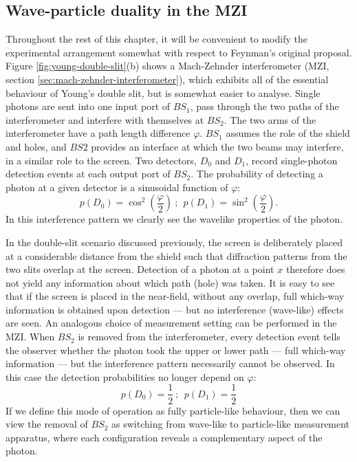
\subsection{Wave-particle duality in the MZI}
Throughout the rest of this chapter, it will be convenient to modify the experimental arrangement somewhat with respect to Feynman's original proposal. Figure \ref{fig:young-double-slit}(b) shows a Mach-Zehnder interferometer (MZI, section \ref{sec:mach-zehnder-interferometer}), which exhibits all of the essential behaviour of Young's double slit, but is somewhat easier to analyse. Single photons are sent into one input port of $BS_1$, pass through the two paths of the interferometer and interfere with themselves at $BS_2$. 
The two arms of the interferometer have a path length difference $\varphi$.
$BS_1$ assumes the role of the shield and holes, and $BS2$ provides an interface at which the two beams may interfere, in a similar role to the screen. Two detectors, $D_0$ and $D_1$, record single-photon detection events at each output port of $BS_2$. The probability of detecting a photon at a given detector is a sinusoidal function of $\varphi$:
\begin{equation}
    p(D_0)=\cos^2\left(\frac{\varphi}{2} \right)~;~~ p(D_1)=\sin^2\left(\frac{\varphi}{2} \right).
\end{equation}
In this interference pattern we clearly see the wavelike properties of the photon. 

In the double-slit scenario discussed previously, the screen is deliberately placed at a considerable distance from the shield such that diffraction patterns from the two slits overlap at the screen. Detection of a photon at a point $x$ therefore does not yield any information about which path (hole) was taken. It is easy to see that if the screen is placed in the near-field, without any overlap, full which-way information is obtained upon detection --- but no interference (wave-like) effects are seen. An analogous choice of measurement setting can be performed in the MZI. When $BS_2$ is removed from the interferometer, every detection event tells the observer whether the photon took the upper or lower path --- full which-way information --- but the interference pattern necessarily cannot be observed. In this case the detection probabilities no longer depend on $\varphi$:
\begin{equation}
    p(D_0)=\frac{1}{2}~;~~ p(D_1)=\frac{1}{2}
\end{equation}
If we define this mode of operation as fully particle-like behaviour, then we can view the removal of $BS_2$ as switching from wave-like to particle-like measurement apparatus, where each configuration reveals a complementary aspect of the photon.

